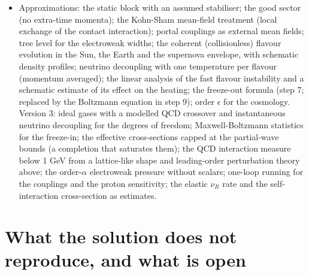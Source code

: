 \documentclass[
  10pt,
]{article}
\begin{document}
\begin{itemize}
  Feynman-Hellmann pressure against the trace anomaly (\(10^{-16}\)) and
  the rate fractions above the unitarity crossings by adaptive
  quadrature with the breakpoints of the thermal weight.
\item
  Approximations: the static block with an assumed stabiliser; the good
  sector (no extra-time momenta); the Kohn-Sham mean-field treatment
  (local exchange of the contact interaction); portal couplings as
  external mean fields; tree level for the electroweak widths; the
  coherent (collisionless) flavour evolution in the Sun, the Earth and
  the supernova envelope, with schematic density profiles; neutrino
  decoupling with one temperature per flavour (momentum averaged); the
  linear analysis of the fast flavour instability and a schematic
  estimate of its effect on the heating; the freeze-out formula (step 7;
  replaced by the Boltzmann equation in step 9); order \(\epsilon\) for
  the cosmology. Version 3: ideal gases with a modelled QCD crossover
  and instantaneous neutrino decoupling for the degrees of freedom;
  Maxwell-Boltzmann statistics for the freeze-in; the effective
  cross-sections capped at the partial-wave bounds (a completion that
  saturates them); the QCD interaction measure below 1 GeV from a
  lattice-like shape and leading-order perturbation theory above; the
  order-\(\alpha\) electroweak pressure without scalars; one-loop
  running for the couplings and the proton sensitivity; the elastic
  \(\nu_R\) rate and the self-interaction cross-section as estimates.
\end{itemize}

\hypertarget{what-the-solution-does-not-reproduce-and-what-is-open}{%
\section{What the solution does not reproduce, and what is
open}\label{what-the-solution-does-not-reproduce-and-what-is-open}}
\end{document}
